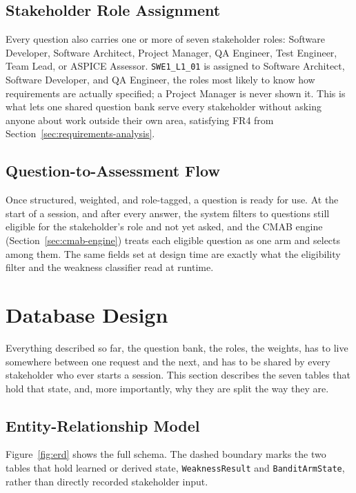 \documentclass[a4paper, 12pt, oneside, openany, BCOR1cm,toc=chapterentrywithdots]{scrbook}
\begin{document}
\subsection{Stakeholder Role Assignment}

Every question also carries one or more of seven stakeholder roles: Software Developer,
Software Architect, Project Manager, QA Engineer, Test Engineer, Team Lead, or ASPICE Assessor.
\texttt{SWE1\_L1\_01} is assigned to Software Architect, Software Developer, and QA Engineer, the
roles most likely to know how requirements are actually specified; a Project Manager is never
shown it. This is what lets one shared question bank serve every stakeholder without asking
anyone about work outside their own area, satisfying FR4 from
Section~\ref{sec:requirements-analysis}.

\subsection{Question-to-Assessment Flow}

Once structured, weighted, and role-tagged, a question is ready for use. At the start of a
session, and after every answer, the system filters to questions still eligible for the
stakeholder's role and not yet asked, and the CMAB engine (Section~\ref{sec:cmab-engine}) treats
each eligible question as one arm and selects among them. The same fields set at design time are
exactly what the eligibility filter and the weakness classifier read at runtime.

\section{Database Design}

Everything described so far, the question bank, the roles, the weights, has to live somewhere
between one request and the next, and has to be shared by every stakeholder who ever starts a
session. This section describes the seven tables that hold that state, and, more importantly,
why they are split the way they are.

\subsection{Entity-Relationship Model}

Figure~\ref{fig:erd} shows the full schema. The dashed boundary marks the two tables that hold
learned or derived state, \texttt{WeaknessResult} and \texttt{BanditArmState}, rather than
directly recorded stakeholder input.
\end{document}
